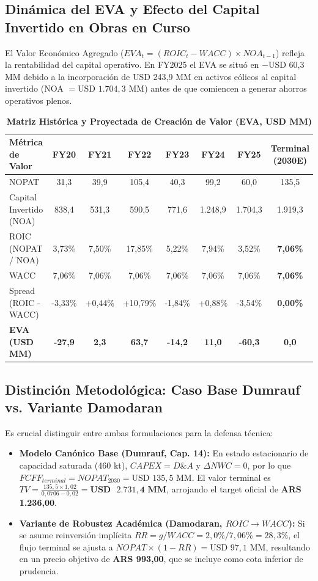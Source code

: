 \documentclass[10pt,a4paper]{article}
\begin{document}
\subsection{Dinámica del EVA y Efecto del Capital Invertido en Obras en Curso}
El Valor Económico Agregado ($EVA_t = (ROIC_t - WACC) \times NOA_{t-1}$) refleja la rentabilidad del capital operativo. En FY2025 el EVA se situó en $-$USD 60,3 MM debido a la incorporación de USD 243,9 MM en activos eólicos al capital invertido (NOA $= \text{USD } 1.704,3\text{ MM}$) antes de que comiencen a generar ahorros operativos plenos.

\begin{table}[H]
\centering
\caption{\textbf{Matriz Histórica y Proyectada de Creación de Valor (EVA, USD MM)}}
\scriptsize
\begin{tabularx}{\textwidth}{Xcccccc|c}
\toprule
\textbf{Métrica de Valor} & \textbf{FY20} & \textbf{FY21} & \textbf{FY22} & \textbf{FY23} & \textbf{FY24} & \textbf{FY25} & \textbf{Terminal (2030E)} \\
\midrule
NOPAT & 31,3 & 39,9 & 105,4 & 40,3 & 99,2 & 60,0 & 135,5 \\
Capital Invertido (NOA) & 838,4 & 531,3 & 590,5 & 771,6 & 1.248,9 & 1.704,3 & 1.919,3 \\
ROIC (NOPAT / NOA) & 3,73\% & 7,50\% & 17,85\% & 5,22\% & 7,94\% & 3,52\% & \textbf{7,06\%} \\
WACC & 7,06\% & 7,06\% & 7,06\% & 7,06\% & 7,06\% & 7,06\% & \textbf{7,06\%} \\
Spread (ROIC - WACC) & -3,33\% & +0,44\% & +10,79\% & -1,84\% & +0,88\% & -3,54\% & \textbf{0,00\%} \\
\textbf{EVA (USD MM)} & \textbf{-27,9} & \textbf{2,3} & \textbf{63,7} & \textbf{-14,2} & \textbf{11,0} & \textbf{-60,3} & \textbf{0,0} \\
\bottomrule
\end{tabularx}
\end{table}

\subsection{Distinción Metodológica: Caso Base Dumrauf vs. Variante Damodaran}
Es crucial distinguir entre ambas formulaciones para la defensa técnica:
\begin{itemize}
    \item \textbf{Modelo Canónico Base (Dumrauf, Cap. 14):} En estado estacionario de capacidad saturada (460 kt), $CAPEX = D\&A$ y $\Delta NWC = 0$, por lo que $FCFF_{terminal} = NOPAT_{2030} = \text{USD } 135,5\text{ MM}$. El valor terminal es $TV = \frac{135,5 \times 1,02}{0,0706 - 0,02} = \mathbf{USD\text{ }2.731,4\text{ MM}}$, arrojando el target oficial de \textbf{ARS 1.236,00}.
    \item \textbf{Variante de Robustez Académica (Damodaran, $ROIC \to WACC$):} Si se asume reinversión implícita $RR = g / WACC = 2,0\% / 7,06\% = 28,3\%$, el flujo terminal se ajusta a $NOPAT \times (1 - RR) = \text{USD } 97,1\text{ MM}$, resultando en un precio objetivo de \textbf{ARS 993,00}, que se incluye como cota inferior de prudencia.
\end{itemize}
\end{document}
